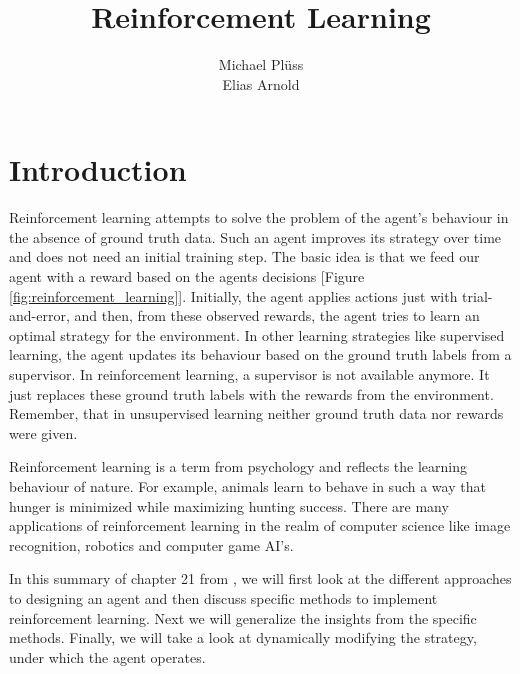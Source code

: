 \documentclass{llncs}
\begin{document}
\title{Reinforcement Learning}
\author{Michael Plüss \\ Elias Arnold}

\maketitle             


\section{Introduction}
Reinforcement learning attempts to solve the problem of the agent's behaviour in the absence of ground truth data. Such an agent improves its strategy over time and does not need an initial training step. The basic idea is that we feed our agent with a reward based on the agents decisions [Figure \ref{fig:reinforcement_learning}]. Initially, the agent applies actions just with trial-and-error, and then, from these observed rewards, the agent tries to learn an optimal strategy for the environment. In other learning strategies like supervised learning, the agent updates its behaviour based on the ground truth labels from a supervisor. In reinforcement learning, a supervisor is not available anymore. It just replaces these ground truth labels with the rewards from the environment. Remember, that in unsupervised learning neither ground truth data nor rewards were given.\par

Reinforcement learning is a term from psychology and reflects the learning behaviour of nature. For example, animals learn to behave in such a way that hunger is minimized while maximizing hunting success. There are many applications of reinforcement learning in the realm of computer science like image recognition, robotics and computer game AI's.\par

In this summary of chapter 21 from \cite{Russell}, we will first look at the different approaches to designing an agent and then discuss specific methods to implement reinforcement learning. Next we will generalize the insights from the specific methods. Finally, we will take a look at dynamically modifying the strategy, under which the agent operates.
\end{document}
